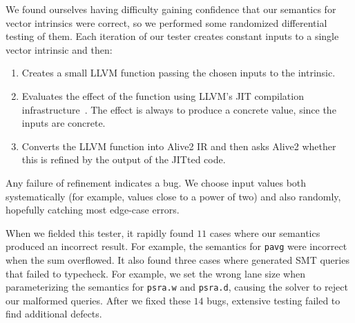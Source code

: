 We found ourselves having difficulty gaining confidence that our
semantics for vector intrinsics were correct, so we performed some
randomized differential testing of them.
%
Each iteration of our tester creates constant inputs to a single
vector intrinsic and then:
\begin{enumerate}
\item
  Creates a small LLVM function passing the chosen inputs to the
  intrinsic.
\item
  Evaluates the effect of the function using LLVM's JIT compilation
  infrastructure~\cite{orc}. The effect is always to produce a concrete value,
  since the inputs are concrete.
\item
  Converts the LLVM function into Alive2 IR and then asks Alive2
  whether this is refined by the output of the JITted code.
\end{enumerate}
%
Any failure of refinement indicates a bug.
%
We choose input values both systematically (for example, values close
to a power of two) and also randomly, hopefully catching most
edge-case errors.


When we fielded this tester, it rapidly found $11$ cases
where our semantics produced an incorrect result.
%
For example, the semantics for \texttt{pavg} were incorrect when the
sum overflowed.
%
It also found three cases where \tool{} generated SMT queries that
failed to typecheck.
%
For example, we set the wrong lane size when parameterizing the
semantics for \texttt{psra.w} and \texttt{psra.d}, causing the solver
to reject our malformed queries.
%
After we fixed these $14$ bugs, extensive testing failed to find
additional defects.







